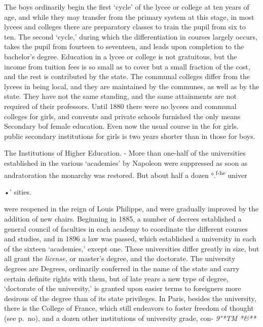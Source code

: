 \documentclass[
]{book}
\begin{document}
The boys ordinarily begin the first `cycle' of the lycee or college at ten years of age, and while they may transfer from the primary system at this stage, in most lycees and colleges there are preparatory classes to train the pupil from six to ten. The second `cycle,' during which the differentiation in courses largely occurs, takes the pupil from fourteen to seventeen, and leads upon completion to the bachelor's degree. Education in a lycee or college is not gratuitous, but the income from tuition fees is so small as to cover but a small fraction of the cost, and the rest is contributed by the state. The communal colleges differ from the lycees in being local, and they are maintained by the communes, as well as by the state.\protect\hypertarget{ch25.xmlux5cux23para.462.1.0.box.103.252.1268.368.q.60}{}{ They have not the same standing, and the same attainments are not required of their professors. Until 1880 there were no lycees and communal colleges for girls, and convents and private schools furnished the only means Secondary bof female education. Even now the usual course in the for girls. public secondary institutions for girls is two years shorter than in those for boys.}

The Institutions of Higher Education. - More than one-half of the universities established in the various `academies' by Napoleon were suppressed as soon as andratoration the monarchy was restored. But about half a dozen °.\textsuperscript{f}'\textsuperscript{he} univer

•' sities.

were reopened in the reign of Louis Philippe, and were gradually improved by the addition of new chairs. Beginning in 1885, a number of decrees established a general council of faculties in each academy to coordinate the different courses and studies, and in 1896 a law was passed, which established a university in each of the sixteen `academies,' except one. These universities differ greatly in size, but all grant the \emph{license,} or master's degree, and the doctorate. The university degrees are Degrees, ordinarily conferred in the name of the state and carry certain definite rights with them, but of late years a new type of degree, `doctorate of the university,' is granted upon easier terms to foreigners more desirous of the degree than of its state privileges. In Paris, besides the university, there is the College of France, which still endeavors to foster freedom of thought (see p.~no), and a dozen other institutions of university grade, con- \emph{9°*TM *\&**}
\end{document}

